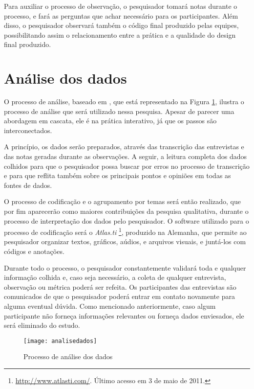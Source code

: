 Para auxiliar o processo de observação, o pesquisador tomará notas durante o
processo, e fará as perguntas que achar necessário para os participantes. Além
disso, o pesquisador observará também o código final produzido pelas equipes,
possibilitando assim o relacionamento entre a prática e a qualidade do design
final produzido.

\section{Análise dos dados}
\label{sec:planejamento-analise}

O processo de análise, baseado em \cite{creswell}, que está representado na
Figura \ref{fig:analise-dados}, ilustra o processo de análise que será utilizado
nessa pesquisa. Apesar de parecer uma abordagem em cascata, ele é na prática 
interativo, já que os passos são interconectados. 

A princípio, os dados serão preparados, através das transcrição das
entrevistas e das notas geradas durante as observações. 
A seguir, a leitura completa dos
dados colhidos para que o pesquisador possa buscar por erros no processo de
transcrição e para que reflita também sobre os principais pontos e opiniões em
todas as fontes de dados.

O processo de codificação e o agrupamento
por temas será então realizado, que por fim aparecerão como maiores
contribuições da pesquisa qualitativa, durante o processo de interpretação dos
dados pelo pesquisador. O software utilizado para o processo de codificação será
o \textit{Atlas.ti} \footnote{\url{http://www.atlasti.com/}. Último acesso em 3
de maio de 2011.}, produzido na Alemanha, que permite ao pesquisador organizar textos,
gráficos, aúdios, e arquivos visuais, e juntá-los com códigos e anotações. 

Durante todo o processo, o pesquisador constantemente validará toda e qualquer
informação colhida e, caso seja necessário, a coleta de qualquer entrevista,
observação ou métrica poderá ser refeita. Os participantes das entrevistas
são comunicados de que o pesquisador poderá entrar em contato
novamente para alguma eventual dúvida.
Como mencionado anteriormente, caso algum participante não forneça informações
relevantes ou forneça dados enviesados, ele será eliminado do estudo.

\begin{figure}
  \centering
  \texttt{[image: analisedados]}
  \caption{Processo de análise dos dados}
  \label{fig:analise-dados}
\end{figure}

